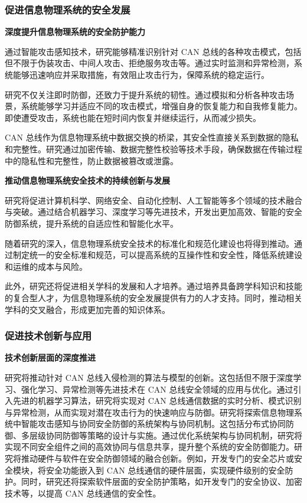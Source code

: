 \subsubsection{促进信息物理系统的安全发展}

\textbf{深度提升信息物理系统的安全防护能力}

通过智能攻击感知技术，研究能够精准识别针对 CAN 总线的各种攻击模式，包括但不限于伪装攻击、中间人攻击、拒绝服务攻击等。通过实时监测和异常检测，系统能够迅速响应并采取措施，有效阻止攻击行为，保障系统的稳定运行。

研究不仅关注即时防御，还致力于提升系统的韧性。通过模拟和分析各种攻击场景，系统能够学习并适应不同的攻击模式，增强自身的恢复能力和自我修复能力。即使遭受攻击，系统也能在短时间内恢复并继续运行，从而减少损失。

CAN 总线作为信息物理系统中数据交换的桥梁，其安全性直接关系到数据的隐私和完整性。研究通过加密传输、数据完整性校验等技术手段，确保数据在传输过程中的隐私性和完整性，防止数据被篡改或泄露。

\textbf{推动信息物理系统安全技术的持续创新与发展}

研究将促进计算机科学、网络安全、自动化控制、人工智能等多个领域的技术融合与突破。通过结合机器学习、深度学习等先进技术，开发出更加高效、智能的安全防御系统，提升系统的自适应性和智能化水平。

随着研究的深入，信息物理系统安全技术的标准化和规范化建设也将得到推动。通过制定统一的安全标准和规范，可以提高系统的互操作性和安全性，降低系统建设和运维的成本与风险。

此外，研究还将促进相关学科的发展和人才培养。通过培养具备跨学科知识和技能的复合型人才，为信息物理系统的安全发展提供有力的人才支持。同时，推动相关学科的交叉融合，形成更加完善的知识体系。

\subsubsection{促进技术创新与应用}

\textbf{技术创新层面的深度推进}

研究将推动针对 CAN 总线入侵检测的算法与模型的创新。这包括但不限于深度学习、强化学习、异常检测等先进技术在 CAN 总线安全领域的应用与优化。通过引入先进的机器学习算法，研究将实现对 CAN 总线通信数据的实时分析、模式识别与异常检测，从而实现对潜在攻击行为的快速响应与防御。研究将探索信息物理系统中智能攻击感知与协同安全防御的系统架构与协同机制。这包括分布式协同防御、多层级协同防御等策略的设计与实施。通过优化系统架构与协同机制，研究将实现不同安全组件之间的高效协同与信息共享，提升整个系统的安全防御能力。研究将推动硬件与软件在安全防御领域的融合创新。例如，开发专门的安全芯片或安全模块，将安全功能嵌入到 CAN 总线通信的硬件层面，实现硬件级别的安全防护。同时，研究还将探索软件层面的安全防护策略，如开发专门的安全协议、加密技术等，以提高 CAN 总线通信的安全性。

